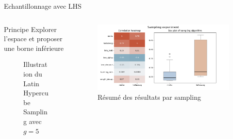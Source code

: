 \begin{frame}{Echantillonnage avec LHS}
    \begin{columns}
        \begin{column}{0.4\textwidth} 
            \begin{block}{Principe}
                Explorer l'espace et proposer une borne inférieure
                
            \end{block}
            \begin{figure}
                \centering
                
                \caption{Illustration du Latin Hypercube Sampling avec $g=5$}
            \end{figure} 
     
            \end{column}
                 
            \begin{column}{0.5\textwidth}
                \begin{figure}
                    \centering
                    \includegraphics[width = \textwidth]{assets/imgs/plots/sampling/lhs.png}
                    \caption{Résumé des résultats par sampling}
                \end{figure} 
            \end{column}
                 
    \end{columns}
\end{frame}

